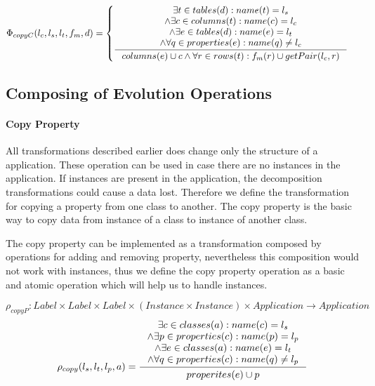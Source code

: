 \documentclass[11pt]{article}
\begin{document}
\begin{equation*}
	\begin{gathered}
		\Phi_{copyC}(l_c, l_s, l_t, f_m, d) = \begin{cases}
 		\inference{\exists t \in tables(d) : name(t) = l_s \\ \wedge \exists c \in columns(t) : name(c) = l_c \\ \wedge \exists e \in tables(d) : name(e) = l_t  \\ \wedge \forall q \in properties(e) : name(q) \neq l_c}{columns(e) \cup c \wedge \forall r \in rows(t) : f_m(r) \cup getPair(l_c,r)}
	\end{cases}
	\end{gathered}
\end{equation*}

\subsection{Composing of Evolution Operations}
\paragraph{Copy Property}
All transformations described earlier does change only the structure of a application. These operation can be used in case there are no instances in the application. If instances are present in the application, the decomposition transformations could cause a data lost. Therefore we define  the transformation for copying a property from one class to another. The copy property is the basic way to copy data from instance of a class to instance of another class.

The copy property can be implemented as a transformation composed by operations for adding and removing property, nevertheless this composition would not work with instances, thus we define the copy property operation as a basic and atomic operation which will help us to handle instances.

$$\rho_{copyP} : Label \times Label \times Label \times (Instance \times Instance) \times Application \rightarrow Application $$
\begin{equation*}
	\rho_{copy}(l_s, l_t, l_p, a) = \inference{\exists c \in classes(a) : name(c) = l_s \\ \wedge \exists p \in properties(c) : name(p) = l_p \\ \wedge \exists e \in classes(a) : name(e) = l_t  \\ \wedge \forall q \in properties(c) : name(q) \neq l_p}{\begin{gathered}
properites(e) \cup p 
\end{gathered}
}
\end{equation*}
\end{document}
